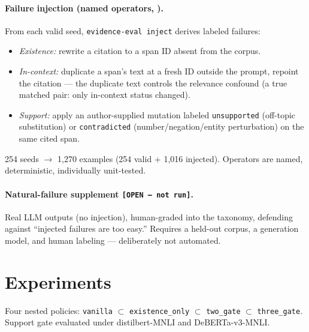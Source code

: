 \paragraph{Failure injection (named operators, \citealp{gardner2020contrast}).}
From each valid seed, \texttt{evidence-eval inject} derives labeled
failures:
\begin{itemize}
  \item \emph{Existence:} rewrite a citation to a span ID absent from
    the corpus.
  \item \emph{In-context:} duplicate a span's text at a fresh ID
    outside the prompt, repoint the citation --- the duplicate text
    controls the relevance confound (a true matched pair: only
    in-context status changed).
  \item \emph{Support:} apply an author-supplied mutation labeled
    \texttt{unsupported} (off-topic substitution) or
    \texttt{contradicted} (number/negation/entity perturbation) on the
    same cited span.
\end{itemize}
254 seeds $\to$ 1{,}270 examples (254 valid + 1{,}016 injected).
Operators are named, deterministic, individually unit-tested.

\paragraph{Natural-failure supplement \texttt{[OPEN --- not run]}.}
Real LLM outputs (no injection), human-graded into the taxonomy,
defending against ``injected failures are too easy.'' Requires a
held-out corpus, a generation model, and human labeling ---
deliberately not automated.

\section{Experiments}
\label{sec:exp}

Four nested policies: \texttt{vanilla} $\subset$
\texttt{existence\_only} $\subset$ \texttt{two\_gate} $\subset$
\texttt{three\_gate}. Support gate evaluated under distilbert-MNLI and
DeBERTa-v3-MNLI.

